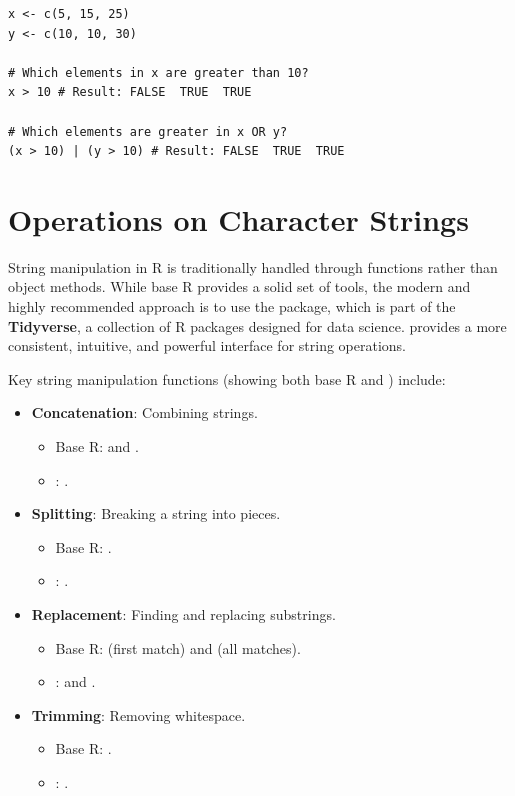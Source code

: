 \begin{example}
\text{ }\begin{verbatim}
x <- c(5, 15, 25)
y <- c(10, 10, 30)

# Which elements in x are greater than 10?
x > 10 # Result: FALSE  TRUE  TRUE

# Which elements are greater in x OR y?
(x > 10) | (y > 10) # Result: FALSE  TRUE  TRUE
\end{verbatim}
\end{example}

\section{Operations on Character Strings}
\label{sec:r_string_ops}
String manipulation in R is traditionally handled through functions rather than object methods. While base R provides a solid set of tools, the modern and highly recommended approach is to use the \textbf{} package, which is part of the \textbf{Tidyverse}, a collection of R packages designed for data science.  provides a more consistent, intuitive, and powerful interface for string operations.

Key string manipulation functions (showing both base R and ) include:
\begin{itemize}
    \item \textbf{Concatenation}: Combining strings.
        \begin{itemize}
            \item Base R:  and .
            \item {}: .
        \end{itemize}
    \item \textbf{Splitting}: Breaking a string into pieces.
        \begin{itemize}
            \item Base R: .
            \item {}: .
        \end{itemize}
    \item \textbf{Replacement}: Finding and replacing substrings.
        \begin{itemize}
            \item Base R:  (first match) and  (all matches).
            \item {}:  and .
        \end{itemize}
    \item \textbf{Trimming}: Removing whitespace.
        \begin{itemize}
            \item Base R: .
            \item {}: .
        \end{itemize}
\end{itemize}


